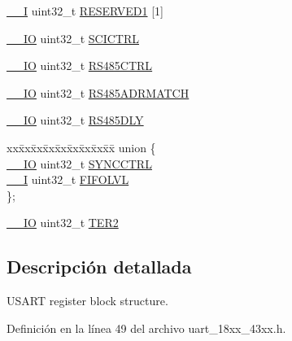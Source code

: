 \begin{DoxyCompactItemize}
\item 
\hyperlink{core__sc300_8h_af63697ed9952cc71e1225efe205f6cd3}{\+\_\+\+\_\+I} uint32\+\_\+t \hyperlink{struct_l_p_c___u_s_a_r_t___t_a606a37e6c3d5b6067982d4f7997395d1}{R\+E\+S\+E\+R\+V\+E\+D1} \mbox{[}1\mbox{]}
\item 
\hyperlink{core__sc300_8h_aec43007d9998a0a0e01faede4133d6be}{\+\_\+\+\_\+\+IO} uint32\+\_\+t \hyperlink{struct_l_p_c___u_s_a_r_t___t_a6c2492017eca871e198d76f9666b1653}{S\+C\+I\+C\+T\+RL}
\item 
\hyperlink{core__sc300_8h_aec43007d9998a0a0e01faede4133d6be}{\+\_\+\+\_\+\+IO} uint32\+\_\+t \hyperlink{struct_l_p_c___u_s_a_r_t___t_a8fa050dd8fb88765dfd1d758dc90bf71}{R\+S485\+C\+T\+RL}
\item 
\hyperlink{core__sc300_8h_aec43007d9998a0a0e01faede4133d6be}{\+\_\+\+\_\+\+IO} uint32\+\_\+t \hyperlink{struct_l_p_c___u_s_a_r_t___t_af3474404c184dbae6cdee388d3ae17d3}{R\+S485\+A\+D\+R\+M\+A\+T\+CH}
\item 
\hyperlink{core__sc300_8h_aec43007d9998a0a0e01faede4133d6be}{\+\_\+\+\_\+\+IO} uint32\+\_\+t \hyperlink{struct_l_p_c___u_s_a_r_t___t_a4bc7d4b838c20506b9951f792a35e463}{R\+S485\+D\+LY}
\item 
\begin{tabbing}
xx\=xx\=xx\=xx\=xx\=xx\=xx\=xx\=xx\=\kill
union \{\\
\>\hyperlink{core__sc300_8h_aec43007d9998a0a0e01faede4133d6be}{\_\_IO} uint32\_t \hyperlink{struct_l_p_c___u_s_a_r_t___t_a9185268c32e68e69d4cc067e1fb01d37}{SYNCCTRL}\\
\>\hyperlink{core__sc300_8h_af63697ed9952cc71e1225efe205f6cd3}{\_\_I} uint32\_t \hyperlink{struct_l_p_c___u_s_a_r_t___t_abe3efa91f1a115b49c3d11d6fda600db}{FIFOLVL}\\
\}; \\

\end{tabbing}\item 
\hyperlink{core__sc300_8h_aec43007d9998a0a0e01faede4133d6be}{\+\_\+\+\_\+\+IO} uint32\+\_\+t \hyperlink{struct_l_p_c___u_s_a_r_t___t_a6929e8b6502e9904314c20fb3a79235e}{T\+E\+R2}
\end{DoxyCompactItemize}


\subsection{Descripción detallada}
U\+S\+A\+RT register block structure. 

Definición en la línea 49 del archivo uart\+\_\+18xx\+\_\+43xx.\+h.



